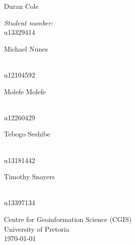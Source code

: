 \documentclass[a4paper,12pt]{report}
\begin{document}
\begin{titlepage}
\begin{center}
\begin{minipage}{0.4\textwidth}
\begin{flushleft}
Duran {Cole}
\end{flushleft}
\end{minipage}
\begin{minipage}{0.4\textwidth}
\begin{flushright} \large
\emph{Student number:} \\
u13329414
\end{flushright}
\end{minipage}
\begin{minipage}{0.4\textwidth}
\begin{flushleft} \large
Michael {Nunes}
\end{flushleft}
\end{minipage}
\begin{minipage}{0.4\textwidth}
\begin{flushright} \large
\emph{} \\
u12104592
\end{flushright}
\end{minipage}
\begin{minipage}{0.4\textwidth}
\begin{flushleft} \large
Molefe {Molefe}
\end{flushleft}
\end{minipage}
\begin{minipage}{0.4\textwidth}
\begin{flushright} \large
\emph{} \\
u12260429
\end{flushright}
\end{minipage}
\begin{minipage}{0.4\textwidth}
\begin{flushleft} \large
Tebogo {Seshibe}
\end{flushleft}
\end{minipage}
\begin{minipage}{0.4\textwidth}
\begin{flushright} \large
\emph{} \\
u13181442
\end{flushright}
\end{minipage}
\begin{minipage}{0.4\textwidth}
\begin{flushleft} \large
Timothy {Snayers}
\end{flushleft}
\end{minipage}
\begin{minipage}{0.4\textwidth}
\begin{flushright} \large
\emph{} \\
u13397134

\end{flushright}

\end{minipage}

\vfill
{\large Centre for Geoinformation Science (CGIS)\\}
{\large University of Pretoria}\\[0.4cm]
{\large \today}
\end{center}
\end{titlepage}
\footnotesize
\normalsize
\end{document}
